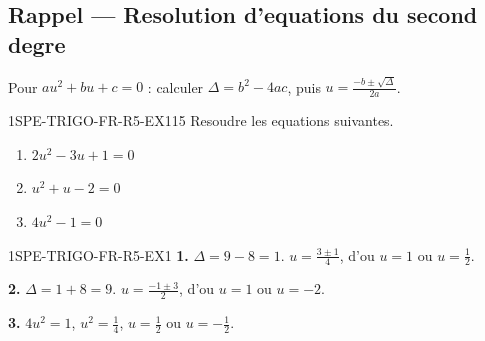 

\subsection*{Rappel — Resolution d'equations du second degre}

Pour $au^2 + bu + c = 0$ : calculer $\Delta = b^2 - 4ac$, puis $u = \frac{-b \pm \sqrt{\Delta}}{2a}$.

\begin{exercice}{1SPE-TRIGO-FR-R5-EX1}{1}{5}
Resoudre les equations suivantes.
\begin{enumerate}
  \item $2u^2 - 3u + 1 = 0$
  \item $u^2 + u - 2 = 0$
  \item $4u^2 - 1 = 0$
\end{enumerate}
\end{exercice}


\begin{corrige}{1SPE-TRIGO-FR-R5-EX1}
\textbf{1.} $\Delta = 9 - 8 = 1$. $u = \frac{3 \pm 1}{4}$, d'ou $u = 1$ ou $u = \frac{1}{2}$.

\textbf{2.} $\Delta = 1 + 8 = 9$. $u = \frac{-1 \pm 3}{2}$, d'ou $u = 1$ ou $u = -2$.

\textbf{3.} $4u^2 = 1$, $u^2 = \frac{1}{4}$, $u = \frac{1}{2}$ ou $u = -\frac{1}{2}$.
\end{corrige}
